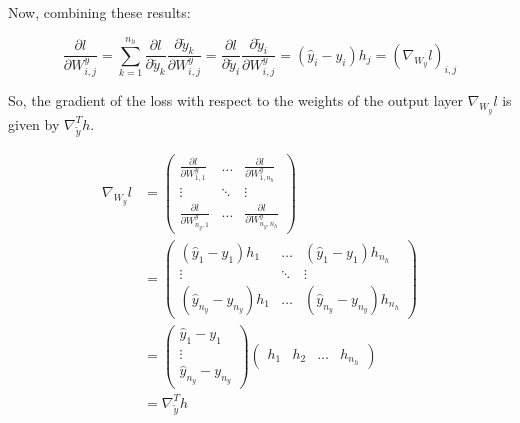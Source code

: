 \documentclass{article}
\theoremstyle{plain}%
\theoremstyle{definition}
\theoremstyle{remark}
\begin{document}
Now, combining these results:

\[
    \frac{\partial l}{\partial W_{i,j}^y} = \sum_{k=1}^{n_h} \frac{\partial l}{\partial \tilde{y}_k} \frac{\partial \tilde{y}_k}{\partial W_{i,j}^y} =  \frac{\partial l}{\partial \tilde{y}_i} \frac{\partial \tilde{y}_i}{\partial W_{i,j}^y} = (\hat{y}_i - y_i) h_j = (\nabla _{W_y} l)_{i,j}
\]

So, the gradient of the loss with respect to the weights of the output layer \( \nabla_{W_y} l \) is given by \( \nabla _{\tilde{y}} ^T h \).

\begin{align*}
    \nabla_{W_y} l & = \begin{pmatrix}
                           \frac{\partial l}{\partial W^y_{1,1}}   & \dots  & \frac{\partial l}{\partial W^y_{1,n_h}}    \\
                           \vdots                                  & \ddots & \vdots                                     \\
                           \frac{\partial l}{\partial W^y_{n_y,1}} & \dots  & \frac{\partial l}{\partial W^y_{n_y, n_h}}
                       \end{pmatrix} \\
                   & = \begin{pmatrix}
                           (\hat{y}_1 - y_1) h_{1}         & \dots  & (\hat{y}_1 - y_1) h_{n_h}         \\
                           \vdots                          & \ddots & \vdots                            \\
                           (\hat{y}_{n_y} - y_{n_y}) h_{1} & \dots  & (\hat{y}_{n_y} - y_{n_y}) h_{n_h}
                       \end{pmatrix}                  \\
                   & = \begin{pmatrix}
                           \hat{y}_1 - y_1 \\
                           \vdots          \\
                           \hat{y}_{n_y} - y_{n_y}
                       \end{pmatrix} \begin{pmatrix}
                                         h_1 & h_2 & \dots & h_{n_h}
                                     \end{pmatrix}                                                     \\
                   & = \nabla _{\tilde{y}} ^T h
\end{align*}
\end{document}
